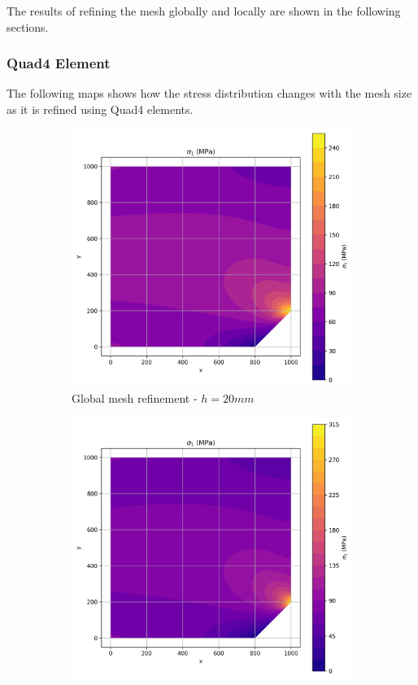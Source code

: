 The results of refining the mesh globally and locally are shown in the following sections.

\subsubsection{Quad4 Element}

The following maps shows how the stress distribution changes with the mesh size as it is refined using Quad4 elements.

\begin{figure}[H]
  \centering
  \begin{subfigure}[b]{0.45\textwidth}
    \centering
    \includegraphics[width=\textwidth]{GRAFICOS/Quad4/2mm_global/resultados - sigma_1.png}
    \caption{Global mesh refinement - $h=20mm$}
    \label{fig:img1}
  \end{subfigure}
  \hfill
  \begin{subfigure}[b]{0.45\textwidth}
    \centering
    \includegraphics[width=\textwidth]{GRAFICOS/Quad4/2mm_local/resultados - sigma_1.png}

\end{subfigure}
\end{figure}
